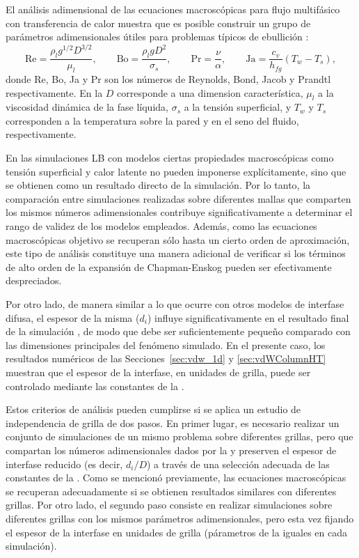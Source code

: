 El an\'alisis adimensional de las ecuaciones macrosc\'opicas para flujo multif\'asico con transferencia de calor muestra que es posible construir un grupo de par\'ametros adimensionales \'utiles para problemas t\'ipicos de ebullici\'on \cite{ajaev_modeling_2006, hua_numerical_2007}:
\begin{equation}
	\mbox{Re} = \dfrac{\rho_l g^{1/2} D^{3/2}}{\mu_l}, \qquad
	\mbox{Bo} = \dfrac{\rho_l g D^2}{\sigma_s}, \qquad
	\mbox{Pr} = \dfrac{\nu}{\alpha}, \qquad
	\mbox{Ja} = \dfrac{c_v}{h_{fg}}(T_w-T_s),
	\label{eq:num_adim_hetb}
\end{equation}
donde Re, Bo, Ja y Pr son los n\'umeros de Reynolds, Bond, Jacob y Prandtl respectivamente. En la  $D$ corresponde a una dimension caracter\'istica, $\mu_l$ a la viscosidad din\'amica de la fase l\'iquida, $\sigma_s$ a la tensi\'on superficial, y $T_w$ y $T_s$ corresponden a la temperatura sobre la pared y en el seno del fluido, respectivamente. 

En las simulaciones LB con modelos \pp{} ciertas propiedades macrosc\'opicas como tensi\'on superficial y calor latente no pueden imponerse expl\'icitamente, sino que se obtienen como un resultado directo de la simulaci\'on. Por lo tanto, la comparaci\'on entre simulaciones realizadas sobre diferentes mallas que comparten los mismos n\'umeros adimensionales contribuye significativamente a determinar el rango de validez de los modelos empleados. Adem\'as, como las ecuaciones macrosc\'opicas objetivo se recuperan s\'olo hasta un cierto orden de aproximaci\'on, este tipo de an\'alisis constituye una manera adicional de verificar si los t\'erminos de alto orden de la expansi\'on de Chapman-Enskog pueden ser efectivamente despreciados.

Por otro lado, de manera similar a lo que ocurre con otros modelos de interfase difusa, el espesor de la misma ($d_i$) influye significativamente en el resultado final de la simulaci\'on \cite{ding_diffuse_2007}, de modo que debe ser suficientemente peque\~no comparado con las dimensiones principales del fen\'omeno simulado. En el presente caso, los resultados num\'ericos de las Secciones~\ref{sec:vdw_1d} y \ref{sec:vdWColumnHT} muestran que el espesor de la interfase, en unidades de grilla, puede ser controlado mediante las constantes de la \eos{}. 

Estos criterios de an\'alisis pueden cumplirse si se aplica un estudio de independencia de grilla de dos pasos. En primer lugar, es necesario realizar un conjunto de simulaciones de un mismo problema sobre diferentes grillas, pero que compartan los n\'umeros adimensionales dados por la  y preserven el espesor de interfase reducido (es decir, $d_i/D$) a trav\'es de una selecci\'on adecuada de las constantes de la \eos{}. Como se mencion\'o previamente, las ecuaciones macrosc\'opicas se recuperan adecuadamente si se obtienen resultados similares con diferentes grillas. Por otro lado, el segundo paso consiste en realizar simulaciones sobre diferentes grillas con los mismos par\'ametros adimensionales, pero esta vez fijando el espesor de la interfase en unidades de grilla (p\'arametros de la \eos{} iguales en cada simulaci\'on). 

